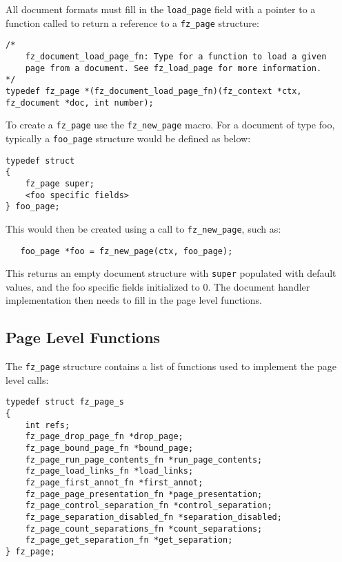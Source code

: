 \documentclass[oneside]{book}
\begin{document}
All document formats must fill in the \texttt{load\_page} field with a pointer to a function called to return a reference to a \texttt{fz\_page} structure:

\begin{lstlisting}
/*
	fz_document_load_page_fn: Type for a function to load a given
	page from a document. See fz_load_page for more information.
*/
typedef fz_page *(fz_document_load_page_fn)(fz_context *ctx, fz_document *doc, int number);
\end{lstlisting}

To create a \texttt{fz\_page} use the \texttt{fz\_new\_page} macro. For a document of type foo, typically a \texttt{foo\_page} structure would be defined as below:

\begin{lstlisting}
typedef struct
{
	fz_page super;
	<foo specific fields>
} foo_page;
\end{lstlisting}

This would then be created using a call to \texttt{fz\_new\_page}, such as:

\begin{lstlisting}
   foo_page *foo = fz_new_page(ctx, foo_page);
\end{lstlisting}

This returns an empty document structure with \texttt{super} populated with default values, and the foo specific fields initialized to 0. The document handler implementation then needs to fill in the page level functions.

\subsection{Page Level Functions}
\label{PageLevelFunctions}

The \texttt{fz\_page} structure contains a list of functions used to implement the page level calls:

\begin{lstlisting}
typedef struct fz_page_s
{
	int refs;
	fz_page_drop_page_fn *drop_page;
	fz_page_bound_page_fn *bound_page;
	fz_page_run_page_contents_fn *run_page_contents;
	fz_page_load_links_fn *load_links;
	fz_page_first_annot_fn *first_annot;
	fz_page_page_presentation_fn *page_presentation;
	fz_page_control_separation_fn *control_separation;
	fz_page_separation_disabled_fn *separation_disabled;
	fz_page_count_separations_fn *count_separations;
	fz_page_get_separation_fn *get_separation;
} fz_page;
\end{lstlisting}
\end{document}
